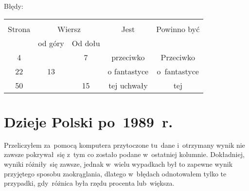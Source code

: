 \documentclass[a4paper,11pt]{article}
\begin{document}
Błędy:\\
\begin{center}
  \begin{tabular}{|c|c|c|c|c|}
    \hline
    & \multicolumn{2}{c|}{} & & \\
    Strona & \multicolumn{2}{c|}{Wiersz} & Jest
                              & Powinno być \\ \cline{2-3}
    & od góry & Od dołu & & \\
    \hline
    4   & &  7 & przeciwko & Przeciwko \\
    22  & 13 & & o\ld{} fantastyce & o~fantastyce \\ %
    50  & & 15 & tej uchwały & tej \\
    \hline
  \end{tabular}
\end{center}

\vspace{\spaceTwo}









\section{Dzieje Polski po~1989~r.}

\vspace{\spaceTwo}






\start {} Przeliczyłem za~pomocą komputera przytoczone tu~dane
i~otrzymany wynik nie zawsze pokrywał~się z~tym co zostało podane
w~ostatniej kolumnie. Dokładniej, wyniki różniły~się zawsze, jednak
w~wielu wypadkach był to zapewne wynik przyjętego sposobu
zaokrąglania, dlatego w~błędach odnotowałem tylko te przypadki,
gdy~różnica była rzędu procenta lub~większa.
\end{document}
